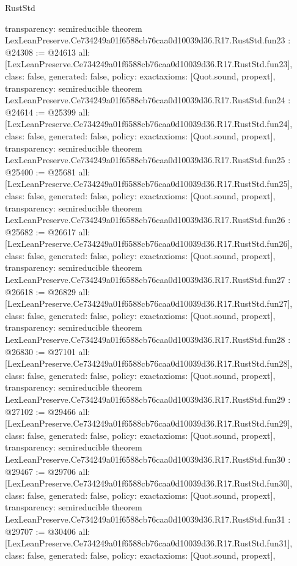 \begin{lexlean}{RustStd}
\begin{coremodule}
{  transparency: semireducible
}
theorem LexLeanPreserve.Ce734249a01f6588cb76caa0d10039d36.R17.RustStd.fun23 : @24308 := @24613 {
  all: [LexLeanPreserve.Ce734249a01f6588cb76caa0d10039d36.R17.RustStd.fun23],
  class: false,
  generated: false,
  policy: exact{axioms: [Quot.sound, propext]},
  transparency: semireducible
}
theorem LexLeanPreserve.Ce734249a01f6588cb76caa0d10039d36.R17.RustStd.fun24 : @24614 := @25399 {
  all: [LexLeanPreserve.Ce734249a01f6588cb76caa0d10039d36.R17.RustStd.fun24],
  class: false,
  generated: false,
  policy: exact{axioms: [Quot.sound, propext]},
  transparency: semireducible
}
theorem LexLeanPreserve.Ce734249a01f6588cb76caa0d10039d36.R17.RustStd.fun25 : @25400 := @25681 {
  all: [LexLeanPreserve.Ce734249a01f6588cb76caa0d10039d36.R17.RustStd.fun25],
  class: false,
  generated: false,
  policy: exact{axioms: [Quot.sound, propext]},
  transparency: semireducible
}
theorem LexLeanPreserve.Ce734249a01f6588cb76caa0d10039d36.R17.RustStd.fun26 : @25682 := @26617 {
  all: [LexLeanPreserve.Ce734249a01f6588cb76caa0d10039d36.R17.RustStd.fun26],
  class: false,
  generated: false,
  policy: exact{axioms: [Quot.sound, propext]},
  transparency: semireducible
}
theorem LexLeanPreserve.Ce734249a01f6588cb76caa0d10039d36.R17.RustStd.fun27 : @26618 := @26829 {
  all: [LexLeanPreserve.Ce734249a01f6588cb76caa0d10039d36.R17.RustStd.fun27],
  class: false,
  generated: false,
  policy: exact{axioms: [Quot.sound, propext]},
  transparency: semireducible
}
theorem LexLeanPreserve.Ce734249a01f6588cb76caa0d10039d36.R17.RustStd.fun28 : @26830 := @27101 {
  all: [LexLeanPreserve.Ce734249a01f6588cb76caa0d10039d36.R17.RustStd.fun28],
  class: false,
  generated: false,
  policy: exact{axioms: [Quot.sound, propext]},
  transparency: semireducible
}
theorem LexLeanPreserve.Ce734249a01f6588cb76caa0d10039d36.R17.RustStd.fun29 : @27102 := @29466 {
  all: [LexLeanPreserve.Ce734249a01f6588cb76caa0d10039d36.R17.RustStd.fun29],
  class: false,
  generated: false,
  policy: exact{axioms: [Quot.sound, propext]},
  transparency: semireducible
}
theorem LexLeanPreserve.Ce734249a01f6588cb76caa0d10039d36.R17.RustStd.fun30 : @29467 := @29706 {
  all: [LexLeanPreserve.Ce734249a01f6588cb76caa0d10039d36.R17.RustStd.fun30],
  class: false,
  generated: false,
  policy: exact{axioms: [Quot.sound, propext]},
  transparency: semireducible
}
theorem LexLeanPreserve.Ce734249a01f6588cb76caa0d10039d36.R17.RustStd.fun31 : @29707 := @30406 {
  all: [LexLeanPreserve.Ce734249a01f6588cb76caa0d10039d36.R17.RustStd.fun31],
  class: false,
  generated: false,
  policy: exact{axioms: [Quot.sound, propext]},
}
\end{coremodule}
\end{lexlean}
